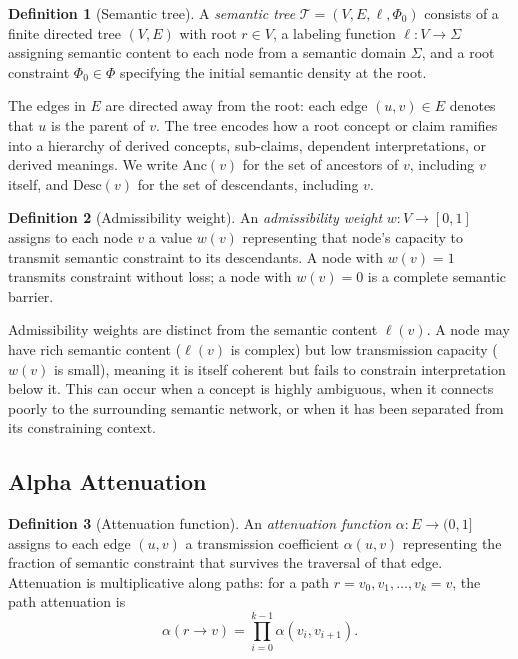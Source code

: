 \documentclass[11pt, a4paper]{article}
\theoremstyle{definition}
\newtheorem{definition}{Definition}
\theoremstyle{remark}
\begin{document}
\begin{definition}[Semantic tree]
A \textit{semantic tree} $\mathcal{T} = (V, E, \ell, \Phi_0)$ consists of
a finite directed tree $(V, E)$ with root $r \in V$, a labeling function
$\ell: V \to \Sigma$ assigning semantic content to each node from a semantic
domain $\Sigma$, and a root constraint $\Phi_0 \in \Phi$ specifying the
initial semantic density at the root.
\end{definition}

The edges in $E$ are directed away from the root: each edge $(u, v) \in E$
denotes that $u$ is the parent of $v$. The tree encodes how a root concept
or claim ramifies into a hierarchy of derived concepts, sub-claims, dependent
interpretations, or derived meanings. We write $\mathrm{Anc}(v)$ for the set
of ancestors of $v$, including $v$ itself, and $\mathrm{Desc}(v)$ for the
set of descendants, including $v$.

\begin{definition}[Admissibility weight]
An \textit{admissibility weight} $w: V \to [0, 1]$ assigns to each node $v$
a value $w(v)$ representing that node's capacity to transmit semantic
constraint to its descendants. A node with $w(v) = 1$ transmits constraint
without loss; a node with $w(v) = 0$ is a complete semantic barrier.
\end{definition}

Admissibility weights are distinct from the semantic content $\ell(v)$. A
node may have rich semantic content ($\ell(v)$ is complex) but low transmission
capacity ($w(v)$ is small), meaning it is itself coherent but fails to
constrain interpretation below it. This can occur when a concept is highly
ambiguous, when it connects poorly to the surrounding semantic network, or when
it has been separated from its constraining context.

\subsection{Alpha Attenuation}

\begin{definition}[Attenuation function]
An \textit{attenuation function} $\alpha: E \to (0, 1]$ assigns to each edge
$(u, v)$ a transmission coefficient $\alpha(u, v)$ representing the fraction
of semantic constraint that survives the traversal of that edge. Attenuation
is multiplicative along paths: for a path $r = v_0, v_1, \ldots, v_k = v$,
the path attenuation is
\[
\alpha(r \to v) = \prod_{i=0}^{k-1} \alpha(v_i, v_{i+1}).
\]
\end{definition}
\end{document}
